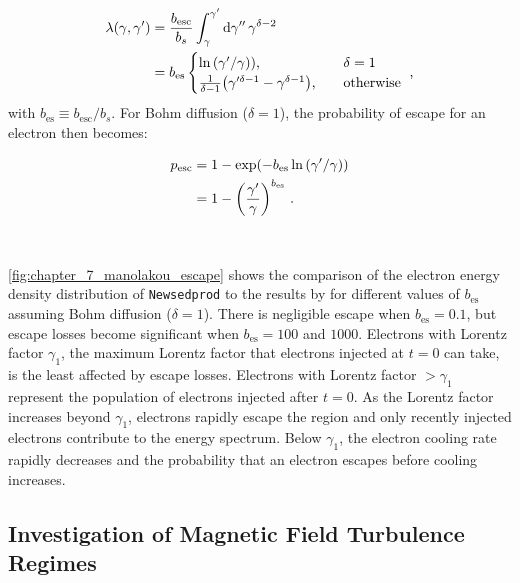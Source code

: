 \begin{equation}
    \begin{aligned}
   	 \lambda\qty(\gamma,\gamma')&=\frac{b_\text{esc}}{b_s}\int_\gamma^{\gamma'}\dd{\gamma''}\gamma^{\delta-2} \\
  	  &=b_\text{es}
  	  \begin{cases}
  		  \ln\qty({\gamma'}/{\gamma}))\text{,}\quad &\delta =1 \\
  		  \frac{1}{\delta-1}\qty(\gamma'^{\delta-1}-\gamma^{\delta -1})\text{,}\quad&\text{otherwise}
    	\end{cases}\text{ ,}
    \end{aligned} \label{eq:chapter_7_lambda_plus_diffusion}
\end{equation}
\noindent with $b_\text{es}\equiv b_\text{esc}/b_s$. For Bohm diffusion ($\delta=1$), the probability of escape for an electron then becomes:

\begin{equation}
    \begin{aligned}
    p_\text{esc}&=1-\exp(-b_\text{es}\ln\qty(\gamma'/\gamma)) \\
    &=1-\qty(\frac{\gamma'}{\gamma})^{b_\text{es}}\text{ .}
    \end{aligned}
\end{equation}
\par~\par
\autoref{fig:chapter_7_manolakou_escape} shows the comparison of the electron energy density distribution of {\tt Newsedprod} to the results  by \cite{2007A&A...474..689M} for different values of $b_\text{es}$ assuming Bohm diffusion ($\delta=1$). There is negligible escape when $b_\text{es}=0.1$, but escape losses become significant when $b_\text{es}=100$ and $1000$. Electrons with Lorentz factor $\gamma_1$, the maximum Lorentz factor that electrons injected at $t=0$ can take, is the least affected by escape losses. Electrons with Lorentz factor $>\gamma_1$ represent the population of electrons injected after $t=0$. As the Lorentz factor increases beyond $\gamma_1$, electrons rapidly escape the region and only recently injected electrons contribute to the energy spectrum. Below $\gamma_1$, the electron cooling rate rapidly decreases and the probability that an electron escapes before cooling increases. 

\subsection{Investigation of Magnetic Field Turbulence Regimes}

